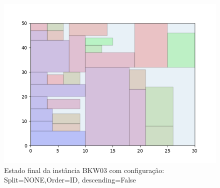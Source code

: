\begin{figure}[H]
    \centering
    \caption[]{Estado final da instância BKW03 com configuração: Split=NONE,Order=ID, descending=False}
    \label{fig:bkw03-none-id-false}
    \includegraphics[scale=0.5]{output/figures/bkw/bkw03/none/id/false/00}
\end{figure}